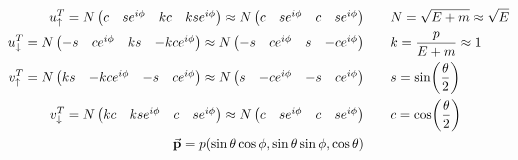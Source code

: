 \begin{align*}
        u_\uparrow^T = N \begin{pmatrix}
                c&se^{i\phi}&kc&kse^{i\phi}
        \end{pmatrix}
        \approx N \begin{pmatrix}
                c&se^{i\phi}&c&se^{i\phi}
        \end{pmatrix}
        &\qquad
        N = \sqrt{E+m} \approx \sqrt{E}
        \\
        u_\downarrow^T = N \begin{pmatrix}
                -s&ce^{i\phi}&ks&-kce^{i\phi}
        \end{pmatrix}
        \approx N \begin{pmatrix}
                -s&ce^{i\phi}&s&-ce^{i\phi}
        \end{pmatrix}
        &\qquad
        k = \frac{p}{E+m} \approx 1
        \\
        v_\uparrow^T = N \begin{pmatrix}
                ks&-kce^{i\phi}&-s&ce^{i\phi}
        \end{pmatrix}
        \approx N \begin{pmatrix}
                s&-ce^{i\phi}&-s&ce^{i\phi}
        \end{pmatrix}
        &\qquad
        s = \sin(\frac{\theta}{2})
        \\
        v_\downarrow^T = N \begin{pmatrix}
                kc&kse^{i\phi}&c&se^{i\phi}
        \end{pmatrix}
        \approx N \begin{pmatrix}
                c&se^{i\phi}&c&se^{i\phi}
        \end{pmatrix}
        &\qquad
        c = \cos(\frac{\theta}{2})
        \\
        \va{p} = p\qty(\sin\theta\cos\phi , \sin\theta\sin\phi , \cos\theta)
\end{align*}
